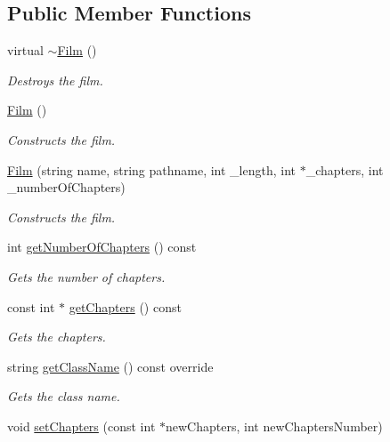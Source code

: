 \subsection*{Public Member Functions}
\begin{DoxyCompactItemize}
\item 
virtual \hyperlink{classFilm_a8dab653f8a6c0635ca5ddbe0bbdd9a25}{$\sim$\+Film} ()
\begin{DoxyCompactList}\small\item\em Destroys the film. \end{DoxyCompactList}\item 
\hypertarget{classFilm_af2835db2b0ef3a87aaa3222f4d9d1ae3}{}\hyperlink{classFilm_af2835db2b0ef3a87aaa3222f4d9d1ae3}{Film} ()\label{classFilm_af2835db2b0ef3a87aaa3222f4d9d1ae3}

\begin{DoxyCompactList}\small\item\em Constructs the film. \end{DoxyCompactList}\item 
\hyperlink{classFilm_a49b995034abaf3bea5637def0e4fa506}{Film} (string name, string pathname, int \+\_\+length, int $\ast$\+\_\+chapters, int \+\_\+number\+Of\+Chapters)
\begin{DoxyCompactList}\small\item\em Constructs the film. \end{DoxyCompactList}\item 
int \hyperlink{classFilm_ac089b88c348722506ebbe11f52457e5a}{get\+Number\+Of\+Chapters} () const 
\begin{DoxyCompactList}\small\item\em Gets the number of chapters. \end{DoxyCompactList}\item 
const int $\ast$ \hyperlink{classFilm_a6d5822c887a754ed6c450e8e2805c980}{get\+Chapters} () const 
\begin{DoxyCompactList}\small\item\em Gets the chapters. \end{DoxyCompactList}\item 
string \hyperlink{classFilm_a6e2b00b6a47bd58b925cca372167697c}{get\+Class\+Name} () const override
\begin{DoxyCompactList}\small\item\em Gets the class name. \end{DoxyCompactList}\item 
void \hyperlink{classFilm_ad8f7bea4b733b53a7f0b34b15c68ec95}{set\+Chapters} (const int $\ast$new\+Chapters, int new\+Chapters\+Number)

\end{DoxyCompactItemize}
